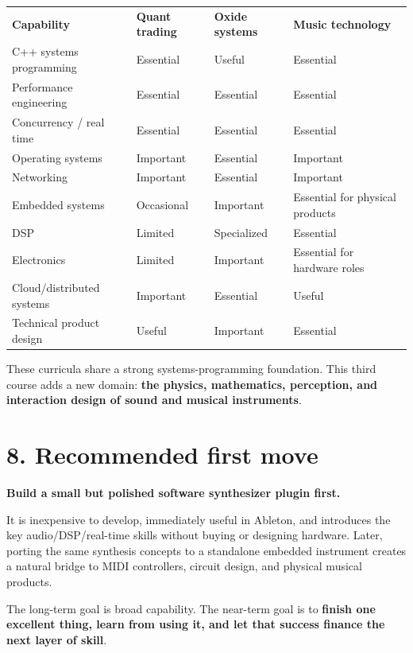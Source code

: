 \documentclass[11pt,letterpaper]{article}
\begin{document}
\begin{center}
\small
\begin{tabular}{>{\raggedright\arraybackslash}p{}>{\raggedright\arraybackslash}p{}>{\raggedright\arraybackslash}p{}>{\raggedright\arraybackslash}p{}}
\textbf{Capability} & \textbf{Quant trading} & \textbf{Oxide systems} & \textbf{Music technology} \\
C++ systems programming & Essential & Useful & Essential \\
Performance engineering & Essential & Essential & Essential \\
Concurrency / real time & Essential & Essential & Essential \\
Operating systems & Important & Essential & Important \\
Networking & Important & Essential & Important \\
Embedded systems & Occasional & Important & Essential for physical products \\
DSP & Limited & Specialized & Essential \\
Electronics & Limited & Important & Essential for hardware roles \\
Cloud/distributed systems & Important & Essential & Useful \\
Technical product design & Useful & Important & Essential \\
\end{tabular}
\end{center}

These curricula share a strong systems-programming foundation. This third course adds a new domain: \textbf{the physics, mathematics, perception, and interaction design of sound and musical instruments}.

\section{8. Recommended first move}\label{recommended-first-move}

\textbf{Build a small but polished software synthesizer plugin first.}

It is inexpensive to develop, immediately useful in Ableton, and introduces the key audio/DSP/real-time skills without buying or designing hardware. Later, porting the same synthesis concepts to a standalone embedded instrument creates a natural bridge to MIDI controllers, circuit design, and physical musical products.

The long-term goal is broad capability. The near-term goal is to \textbf{finish one excellent thing, learn from using it, and let that success finance the next layer of skill}.
\end{document}
